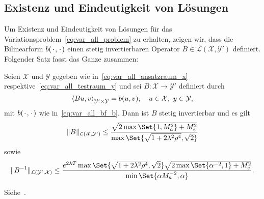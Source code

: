 
\subsection{Existenz und Eindeutigkeit von Lösungen} %
\label{sub:existenz_und_eindeutigkeit_von_l_sungen}

Um Existenz und Eindeutigkeit von Lösungen für das Variationsproblem~\eqref{eq:var_all_problem} zu erhalten, zeigen wir, dass die Bilinearform $b({\mkern2mu\cdot\mkern2mu}, {\mkern2mu\cdot\mkern2mu})$ einen stetig invertierbaren Operator $B \in \mathcal L(\mathcal X, \mathcal Y')$ definiert.
Folgender Satz fasst das Ganze zusammen:

\begin{Satz}
\label{thm:schwab09:theorem51}
    Seien $\mathcal X$ und $\mathcal Y$ gegeben wie in~\eqref{eq:var_all_ansatzraum_x} respektive~\eqref{eq:var_all_testraum_y} und sei $B \colon \mathcal X \to \mathcal Y'$ definiert durch
    \begin{equation}
        \label{eq:var_all_gross_b}
        \left\langle B u,v\right\rangle_{\mathcal Y' \times \mathcal Y} = b(u, v), \quad u \in \mathcal X,~y \in \mathcal Y,
    \end{equation}
    mit $b({\mkern2mu\cdot\mkern2mu}, {\mkern2mu\cdot\mkern2mu})$ wie in~\eqref{eq:var_all_bf_b}.
    Dann ist $B$ stetig invertierbar und es gilt
    \begin{equation}
        \label{eq:var_all_norm_B}
        \norm{B}_{\mathcal L(\mathcal X, \mathcal Y')} \leq \frac{\sqrt{2\max\Set{1, M_{a}^{2}} + M_{e}^{2}}}{\max\Set{\sqrt{1 + 2 \lambda^{2} \rho^{4}}, \sqrt{2}}}
    \end{equation}
    sowie
    \begin{equation}
        \label{eq:var_all_norm_B_inv}
        \norm{B^{-1}}_{\mathcal L(\mathcal Y', \mathcal X)} \leq \frac{e^{2 \lambda T} \max\Set{\sqrt{1 + 2 \lambda^{2} \rho^{4}}, \sqrt{2}} \sqrt{2 \max\Set{ \alpha^{-2}, 1} + M_{e}^{2}}}{\min\Set{\alpha M_{a}^{-2}, \alpha}}.
    \end{equation}

    \begin{Beweis}
        Siehe~\cite[Appendix A]{Schwab:2009ec}.


\end{Beweis}
\end{Satz}
